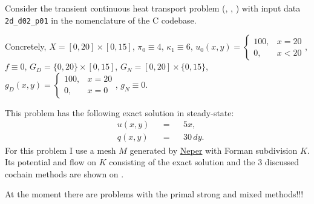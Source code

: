 \begin{example}
  Consider the transient continuous heat transport problem
  (,
   ,
   )
  with input data \verb|2d_d02_p01| in the nomenclature of the C codebase.

  Concretely,
    $X = [0, 20] \times [0, 15]$,
    $\pi_0 \equiv 4$,
    $\kappa_1 \equiv 6$,
    $u_0(x, y) = \begin{cases} 100, & x = 20 \\ 0, & x < 20 \end{cases}$,
    $f \equiv 0$,
    $G_D = \{0, 20\} \times [0, 15]$,
    $G_N = [0, 20] \times \{0, 15\}$,
    $g_D(x, y) = \begin{cases} 100, & x = 20 \\ 0, & x = 0 \end{cases}$,
    $g_N \equiv 0$.

  This problem has the following exact solution in steady-state:
  \begin{subequations}
    \begin{alignat}{3}
      & u(x, y) && = && 5 x, \\
      & q(x, y) && = && 30 \, d y.
    \end{alignat}
  \end{subequations}
  For this problem I use a mesh $M$ generated by
  \href{https://neper.info/}{Neper} with Forman subdivision $K$.
  Its potential and flow on $K$ consisting of the exact solution and the $3$
  discussed cochain methods are shown on
  .

  {\color{red} At the moment there are problems with the primal strong and mixed
  methods!!!}
\end{example}
